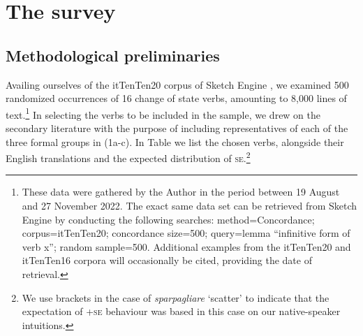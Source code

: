 \documentclass[output=paper,colorlinks,citecolor=brown
]{langscibook}
\begin{document}
\section{The survey}
\label{bentley_section_3}
\subsection{Methodological preliminaries}
\label{bentley_section_3.1}
Availing ourselves of the itTenTen20 corpus of Sketch Engine \citep{jakubicek2013tenten}, we examined 500 randomized occurrences of 16 change of state verbs, amounting to 8,000 lines of text.\footnote{These data were gathered by the Author in the period between 19 August and 27 November 2022. The exact same data set can be retrieved from Sketch Engine by conducting the following searches: method=Concordance; corpus=itTenTen20; concordance size=500; query=lemma “infinitive form of verb x”; random sample=500. Additional examples from the itTenTen20 and itTenTen16 corpora \citep{jakubicek2013tenten} will occasionally be cited, providing the date of retrieval.}  In selecting the verbs to be included in the sample, we drew on the secondary literature \citep{folli2005consuming,cennamo2012aspectual,cennamo2021anticausatives,cennamo2011anticausative,alexiadou2015external,bentley2023internally} with the purpose of including representatives of each of the three formal groups in (1a-c). In Table  we list the chosen verbs, alongside their English translations and the expected distribution of \textsc{se}.\footnote{We use brackets in the case of \textit{sparpagliare} ‘scatter’ to indicate that the expectation of +\textsc{se} behaviour was based in this case on our native-speaker intuitions.}
\end{document}
